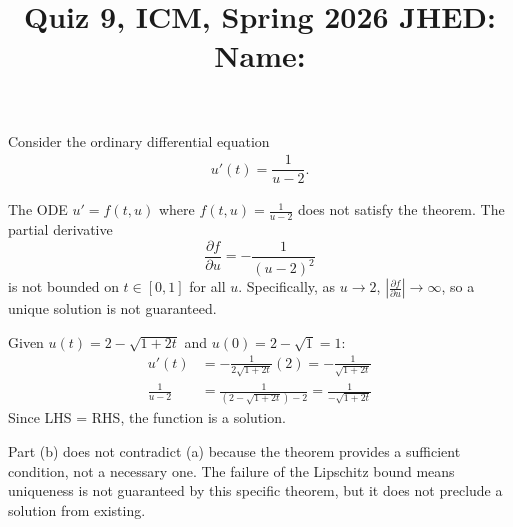 \documentclass[reqno]{exam}
\title{\normalsize{Quiz 9, ICM, Spring 2026 \hspace{1ex} JHED: \underline{\hspace{20ex}} \hspace{2ex} Name: \underline{\hspace{40ex}}}}
\author{}
\date{}
\begin{document}
\maketitle
\vspace{-2cm} %

\begin{questions}
  \question
  Consider the ordinary differential equation
  \begin{align*}
    u'(t) = \dfrac{1}{u - 2}.
  \end{align*}

  \begin{solution}
    The ODE $u' = f(t, u)$ where $f(t, u) = \frac{1}{u-2}$ does not satisfy the theorem. The partial derivative
    $$\frac{\partial f}{\partial u} = -\frac{1}{(u-2)^2}$$
    is not bounded on $t \in [0, 1]$ for all $u$. Specifically, as $u \to 2$, $|\frac{\partial f}{\partial u}| \to \infty$, so a unique solution is not guaranteed.

    Given $u(t) = 2 - \sqrt{1 + 2t}$ and $u(0) = 2 - \sqrt{1} = 1$:
    \begin{align*}
      u'(t)         & = -\frac{1}{2\sqrt{1+2t}}(2) = -\frac{1}{\sqrt{1+2t}}      \\
      \frac{1}{u-2} & = \frac{1}{(2 - \sqrt{1+2t}) - 2} = \frac{1}{-\sqrt{1+2t}}
    \end{align*}
    Since LHS = RHS, the function is a solution.

    Part (b) does not contradict (a) because the theorem provides a sufficient condition, not a necessary one. The failure of the Lipschitz bound means uniqueness is not guaranteed by this specific theorem, but it does not preclude a solution from existing.


\end{solution}
\end{questions}
\end{document}
